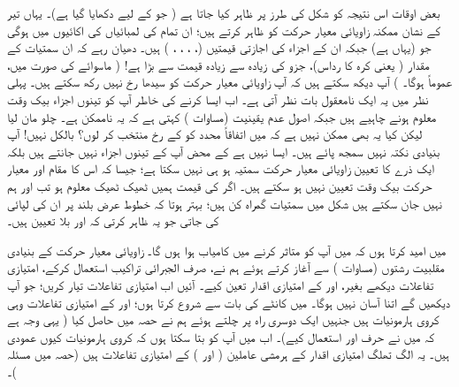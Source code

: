 بعض اوقات اس نتیجہ کو شکل  کی طرز پر ظاہر کیا جاتا ہے ( جو  کے لیے دکھایا گیا ہے)۔ یہاں تیر کے نشان ممکنہ زاویائی  معیار حرکت کو ظاہر کرتے ہیں؛  ان تمام کی لمبائیاں   کی اکائیوں میں  ہوگی جو (یہاں  ہے)  جبکہ  ان  کے  اجزاء  کی اجازتی قیمتیں (، ، ، ، )  ہیں۔  دھیان رہے کہ ان سمتیات  کے مقدار (  یعنی کرہ کا رداس)،    جزو کی زیادہ سے زیادہ قیمت سے بڑا ہے! (  ماسوائے  کی  صورت میں،   عموماً  ہوگا۔  )  آپ دیکھ سکتے ہیں کہ آپ زاویائی معیار حرکت کو سیدھا   رخ نہیں رکھ سکتے ہیں۔ پہلی نظر میں یہ ایک نامعقول بات نظر آتی ہے۔ اب ایسا کرنے کی خاطر آپ کو تینوں اجزاء بیک وقت معلوم ہونے چاہیے ہیں جبکہ اصول عدم یقینیت  (مساوات  )   کہتی ہے کہ یہ ناممکن ہے۔  چلو  مان لیا لیکن کیا یہ بھی ممکن نہیں ہے کہ میں اتفاقاً   محدد کو  کے رخ منتخب  کر    لوں؟     بالکل نہیں!  آپ بنیادی نکتہ نہیں سمجھ پائے  ہیں۔  ایسا نہیں ہے کے  محض آپ   کے تینوں اجزاء نہیں جانتے ہیں بلکہ ایک ذرے   کا   تعیین زاویائی معیار حرکت سمتیہ  ہو ہی  نہیں  سکتا ہے؛  جیسا کہ اس کا مقام اور معیار حرکت بیک وقت تعیین  نہیں ہو سکتے ہیں۔ اگر  کی قیمت  ہمیں ٹھیک ٹھیک معلوم ہو تب  اور  ہم  نہیں جان سکتے ہیں  شکل    میں سمتیات گمراہ کن ہیں؛  بہتر ہوتا کہ خطوط عرض بلند پر  ان کی لپائی کی جاتی جو یہ ظاہر کرتی کہ  اور  بلا تعیین  ہیں۔

 میں امید کرتا ہوں کہ میں آپ کو متاثر کرنے میں کامیاب ہوا ہوں گا۔  زاویائی معیار حرکت کے بنیادی مقلبیت رشتوں   (مساوات ) سے آغاز کرتے ہوئے ہم نے،  صرف الجبرائی تراکیب استعمال کرکے،  امتیازی تفاعلات دیکھے بغیر،   اور  کے امتیازی اقدار تعین کیے۔ آئیں  اب امتیازی تفاعلات تیار کریں؛  جو  آپ دیکھیں گے اتنا آسان نہیں ہوگا۔ میں  کانٹے  کی بات     سے شروع کرتا ہوں؛   اور  کے  امتیازی تفاعلات وہی کروی ہارمونیات ہیں جنہیں ایک دوسری راہ پر چلتے ہوئے ہم نے حصہ  میں حاصل کیا (  یہی وجہ ہے کہ میں نے حرف  اور  استعمال کیے)۔  اب میں آپ کو بتا  سکتا ہوں  کہ کروی ہارمونیات کیوں عمودی ہیں۔ یہ الگ تھلگ امتیازی اقدار کے ہرمشی عاملین (  اور )  کے امتیازی تفاعلات ہیں (حصہ  میں مسئلہ )۔ 

